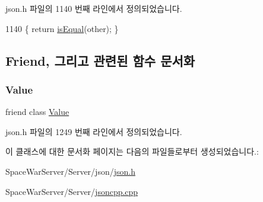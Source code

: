 json.\+h 파일의 1140 번째 라인에서 정의되었습니다.


\begin{DoxyCode}
1140 \{ \textcolor{keywordflow}{return} \hyperlink{class_json_1_1_value_iterator_base_a010b5ad3f3337ae3732e5d7e16ca5e25}{isEqual}(other); \}
\end{DoxyCode}


\subsection{Friend, 그리고 관련된 함수 문서화}
\mbox{\label{class_json_1_1_value_iterator_aeceedf6e1a7d48a588516ce2b1983d6f}} 
\subsubsection{\texorpdfstring{Value}{Value}}
{\footnotesize\ttfamily friend class \hyperlink{class_json_1_1_value}{Value}\hspace{0.3cm}{\ttfamily [friend]}}



json.\+h 파일의 1249 번째 라인에서 정의되었습니다.



이 클래스에 대한 문서화 페이지는 다음의 파일들로부터 생성되었습니다.\+:\begin{DoxyCompactItemize}
\item 
Space\+War\+Server/\+Server/json/\hyperlink{json_8h}{json.\+h}\item 
Space\+War\+Server/\+Server/\hyperlink{jsoncpp_8cpp}{jsoncpp.\+cpp}\end{DoxyCompactItemize}
